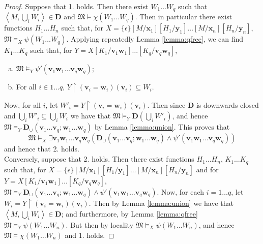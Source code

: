 \documentclass{article}
\theoremstyle{definition}
\newcommand{\tuple}{\mathbf}
\newcommand{\M}{\mathfrak M}
\newcommand{\D}{\mathbf D}
\begin{document}
\begin{proof}
	Suppose that 1. holds. Then there exist  $W_1 \ldots W_q$ such that\\$\left\langle M, \bigcup_i W_i\right \rangle \in \D$ and $\M \models \chi(W_1 \ldots W_q)$. Then in particular there exist functions $H_1 \ldots H_n$ such that, for $X = \{\epsilon\}[M / \tuple x_1] [H_1 / \tuple y_1] \ldots[M/\tuple x_n][H_n/\tuple y_n]$, $\M \models_X \psi(W_1 \ldots W_q)$. Applying repeatedly Lemma \ref{lemma:qfree}, we can find $K_1 \ldots K_q$ such that, for $Y = X[K_1/\tuple v_1 \tuple w_1]\ldots[K_q/\tuple v_q \tuple w_q]$,
	\begin{enumerate}[a)]
		\item $\M \models_{Y} \psi'(\tuple v_1 \tuple w_1 \ldots \tuple v_q \tuple w_q)$; 
		\item For all $i \in 1 \ldots q$, $Y\upharpoonright (\tuple v_i = \tuple w_i)(\tuple v_i) \subseteq W_i$.
	\end{enumerate}
	Now, for all $i$, let $W'_i  = Y\upharpoonright (\tuple v_i = \tuple w_i)(\tuple v_i)$. Then since $\D$ is downwards closed and $\bigcup_i W'_i \subseteq \bigcup_i W_i$ we have that $\M \models_Y \D(\bigcup_i W'_i)$, and hence $\M \models_Y \D_\cup(\tuple v_1 \ldots \tuple v_q ; \tuple w_1 \ldots \tuple w_q)$ by Lemma \ref{lemma:union}. This proves that 
	\[
		\M \models_X \exists \tuple v_1 \tuple w_1 \ldots \tuple v_q \tuple w_q (\D_\cup(\tuple v_1 \ldots \tuple v_q; \tuple w_1 \ldots \tuple w_q) \wedge \psi'(\tuple v_1 \tuple w_1 \ldots \tuple v_q \tuple w_q))
	\]
	and hence that 2. holds. \\

	Conversely, suppose that 2. holds. Then there exist functions $H_1 \ldots H_n$, $K_1 \ldots K_q$ such that, for $X = \{\epsilon\}[M/\tuple x_1][H_1/\tuple y_1]\ldots[M/\tuple x_n][H_n/\tuple y_n]$ and for $Y = X[K_1 /\tuple v_1 \tuple w_1]\ldots [K_q/\tuple v_q \tuple w_q]$, $\M \models_Y \D_\cup(\tuple v_1 \ldots \tuple v_q; \tuple w_1 \ldots \tuple w_q) \wedge \psi'(\tuple v_1 \tuple w_1 \ldots \tuple v_q \tuple w_q)$. Now, for each $i = 1 \ldots q$, let $W_i = Y\upharpoonright (\tuple v_i = \tuple w_i)(\tuple v_i)$. Then by Lemma \ref{lemma:union} we have that $\left \langle M, \bigcup_i W_i \right \rangle \in \D$; and furthermore, by Lemma \ref{lemma:qfree} $\M \models_Y \psi(W_1 \ldots W_n)$. But then by locality $\M \models_X \psi(W_1 \ldots W_n)$, and hence $\M \models \chi(W_1 \ldots W_n)$ and 1. holds. 
\end{proof}
\end{document}
